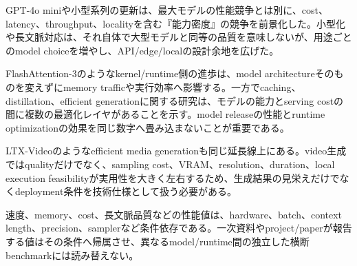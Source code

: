
GPT-4o miniや小型系列の更新は、最大モデルの性能競争とは別に、cost、latency、throughput、localityを含む『能力密度』の競争を前景化した。小型化や長文脈対応は、それ自体で大型モデルと同等の品質を意味しないが、用途ごとのmodel choiceを増やし、API/edge/localの設計余地を広げた。\autocite{src-031c86eaad2b,src-ec05e05a8071,src-f086061a9e86}


FlashAttention-3のようなkernel/runtime側の進歩は、model architectureそのものを変えずにmemory trafficや実行効率へ影響する。一方でcaching、distillation、efficient generationに関する研究は、モデルの能力とserving costの間に複数の最適化レイヤがあることを示す。model releaseの性能とruntime optimizationの効果を同じ数字へ畳み込まないことが重要である。\autocite{src-3aa7f9dab810,src-ecac5d71389f,src-ee43656ed6da,src-fc4f100c5e5a}


LTX-Videoのようなefficient media generationも同じ延長線上にある。video生成ではqualityだけでなく、sampling cost、VRAM、resolution、duration、local execution feasibilityが実用性を大きく左右するため、生成結果の見栄えだけでなくdeployment条件を技術仕様として扱う必要がある。\autocite{src-fd5d0edaf394}


\begin{claimboundary}
速度、memory、cost、長文脈品質などの性能値は、hardware、batch、context length、precision、samplerなど条件依存である。一次資料やproject/paperが報告する値はその条件へ帰属させ、異なるmodel/runtime間の独立した横断benchmarkには読み替えない。\autocite{src-3aa7f9dab810}
\end{claimboundary}
